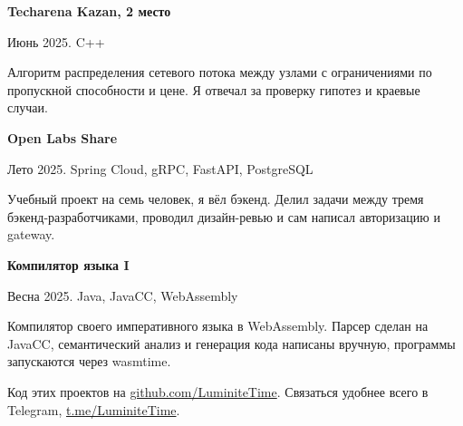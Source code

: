 \documentclass[10pt,a4paper]{article}
\newcommand{\project}[3]{%
  \begin{minipage}[t]{\linewidth}
    {\large\textbf{#1}\par}
    {\small\color{muted} #2\par}
    \vspace{2pt}
    #3\par
  \end{minipage}\par\vspace{10pt}
}
\begin{document}
\project{Techarena Kazan, 2 место}{Июнь 2025. C++}
{Алгоритм распределения сетевого потока между узлами с ограничениями по пропускной способности и цене.
Я отвечал за проверку гипотез и краевые случаи.}

\project{Open Labs Share}{Лето 2025. Spring Cloud, gRPC, FastAPI, PostgreSQL}
{Учебный проект на семь человек, я вёл бэкенд. Делил задачи между тремя бэкенд-разработчиками, проводил
дизайн-ревью и сам написал авторизацию и gateway.}

\project{Компилятор языка I}{Весна 2025. Java, JavaCC, WebAssembly}
{Компилятор своего императивного языка в WebAssembly. Парсер сделан на JavaCC, семантический анализ и
генерация кода написаны вручную, программы запускаются через wasmtime.}

\vfill
{\small\color{muted} Код этих проектов на \href{https://github.com/LuminiteTime}{\color{accent}github.com/LuminiteTime}.
Связаться удобнее всего в Telegram, \href{https://t.me/LuminiteTime}{\color{accent}t.me/LuminiteTime}.\par}
\end{document}
